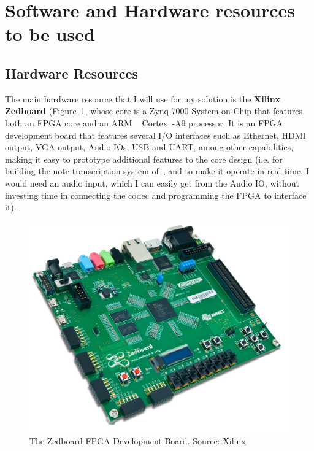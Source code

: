 \section{Software and Hardware resources to be used}\label{sec:wp_sh}

\subsection{Hardware Resources}
The main hardware resource that I will use for my solution is the \textbf{Xilinx\textregistered~ Zedboard} (Figure~\ref{fig:zedboard}, whose core is a Zynq-7000 System-on-Chip that features both an FPGA core and an ARM \textregistered~ Cortex\texttrademark~-A9 processor. It is an FPGA development board that features several I/O interfaces such as Ethernet, HDMI output, VGA output, Audio IOs, USB and UART, among other capabilities, making it easy to prototype additional features to the core design (i.e. for building the note transcription system of~\cite{Bock12}, and to make it operate in real-time, I would need an audio input, which I can easily get from the Audio IO, without investing time in connecting the codec and programming the FPGA to interface it).

\begin{figure}
    \centering
    \includegraphics[width=\linewidth]{figures/zedboard.jpg}
    \caption{The Zedboard FPGA Development Board. Source: \href{http://www.xilinx.com}{Xilinx}}
    \label{fig:zedboard}
\end{figure}

